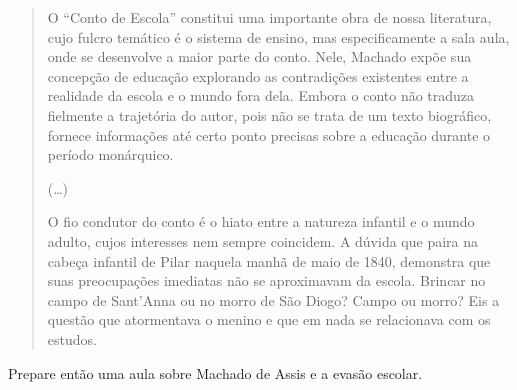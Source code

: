 \documentclass[12pt]{extarticle}
\begin{document}
\begin{quote}
O ``Conto de Escola'' constitui uma importante obra de nossa literatura, 
cujo fulcro temático é o sistema de ensino, mas especificamente a sala 
aula, onde se desenvolve a maior parte do conto. Nele, Machado expõe 
sua concepção de educação explorando as contradições existentes  
entre  a  realidade  da  escola  e  o  mundo  fora  dela.  Embora  o  
conto  não  traduza fielmente a trajetória do autor, pois não se 
trata de um texto biográfico, fornece informações até certo ponto 
precisas sobre a educação durante o período monárquico.

(\ldots{})

O  fio  condutor  do  conto  é  o  hiato  entre  a  natureza  infantil  
e  o  mundo  adulto,  cujos interesses  nem  sempre  coincidem.  
A  dúvida  que  paira  na  cabeça  infantil  de  Pilar  naquela 
manhã de maio de 1840, demonstra que suas preocupações imediatas não 
se aproximavam da escola. Brincar no campo de Sant'Anna ou no morro 
de São Diogo? Campo ou morro? Eis a questão  que  atormentava  o  menino  
e  que  em  nada  se  relacionava  com  os  estudos.
\end{quote}

Prepare então uma aula sobre Machado de Assis e a evasão escolar. 
\end{document}

